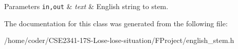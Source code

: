 \begin{DoxyParams}[1]{Parameters}
\mbox{\tt in,out}  & {\em text} & English string to stem. \\
\hline
\end{DoxyParams}


The documentation for this class was generated from the following file\+:\begin{DoxyCompactItemize}
\item 
/home/coder/\+C\+S\+E2341-\/17\+S-\/\+Lose-\/lose-\/situation/\+F\+Project/english\+\_\+stem.\+h\end{DoxyCompactItemize}
